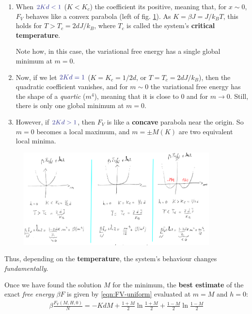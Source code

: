\documentclass[../../main.tex]{subfiles}
\begin{document}
\begin{enumerate}
    \item When $\textcolor{Blue}{2Kd < 1}$ ($K < K_c$) the coefficient its positive, meaning that, for $x \sim 0$, $F_V$ behaves like a convex parabola (left of fig. \ref{fig:variational_cases}). As $K = \beta J = J/k_B T$, this holds for $T > T_c = 2d J/k_B$, where $T_c$ is called the system's \textbf{critical temperature}. 

    Note how, in this case, the variational free energy has a single global minimum at $m=0$.
    \item Now, if we let $\textcolor{Blue}{2Kd = 1}$ ($K=K_c = 1/2d$, or $T=T_c = 2dJ/k_B$), then the quadratic coefficient vanishes, and for $m \sim 0$ the variational free energy has the shape of a \textit{quartic} ($m^4$), meaning that it is close to $0$ and  for $m \to 0$. Still, there is only one global minimum at $m=0$.
    \item However, if $\textcolor{Blue}{2Kd > 1}$, then $F_V$ is like a \textbf{concave} parabola near the origin. So $m=0$ becomes a local maximum, and $m = \pm M(K)$ are two equivalent local minima. 
\end{enumerate}

\begin{figure}[H]
    \centering
    \includegraphics[width=0.9\textwidth]{variational_cases.png}
    \caption{} %
    \label{fig:variational_cases}
\end{figure}

Thus, depending on the \textbf{temperature}, the system's behaviour changes \textit{fundamentally}.  

\medskip

Once we have found the solution $M$ for the minimum, the \textbf{best estimate} of the exact \textit{free energy} $\beta F$ is given by \ref{eqn:FV-uniform} evaluated at $m=M$ and $h=0$:
\begin{align*}
    \beta \frac{F_V(M,H,0)}{N} = -K d M + \frac{1+M}{2} \ln \frac{1+M}{2} + \frac{1-M}{2} \ln \frac{1-M}{2}     
\end{align*}
\end{document}
